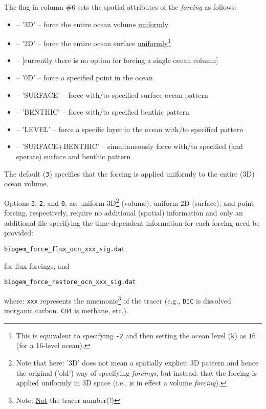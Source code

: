 \noindent The flag in column \#\(6\)  sets the spatial attributes of the \textit{forcing} as follows:
\vspace{1mm}
\begin{itemize}[noitemsep]
\item [3] -- '3D' -- force the entire ocean volume \uline{uniformly}
\item [2] -- '2D' -- force the entire ocean surface \uline{uniformly}\footnote{This is equivalent to specifying \texttt{-2}  and then setting the ocean level (\texttt{k}) as \(16\) (for a 16-level ocean).}
\item [1] -- [currently there is no option for forcing a single ocean column]
\item [0] -- '0D' -- force a specified point in the ocean
\item [-1] -- 'SURFACE' -- force with/to specified surface ocean pattern
\item [-2] -- 'BENTHIC' -- force with/to specified benthic pattern
\item [-3] -- 'LEVEL' -- force a specific layer in the ocean with/to specified pattern
\item [-4] -- 'SURFACE+BENTHIC' -- simultaneously force with/to specified (and sperate) surface and benthic pattern
\end{itemize}
\vspace{1mm}
The default (\texttt{3}) specifies that the forcing is applied uniformly to the entire (3D) ocean volume.

\vspace{1mm}

Options \texttt{3}, \texttt{2}, and \texttt{0}, as: uniform 3D\footnote{Note that here: '3D' does not mean a spatially explicit 3D pattern and hence the original ('old') way of specifying \textit{forcings}, but instead: that the forcing is applied uniformly in 3D space (i.e., is in effect a volume \textit{forcing}).} (volume), uniform 2D (surface), and point forcing, respectively, require no additional (spatial) information and only an additional file specifying the time-dependent information for each forcing need be provided:
\vspace{-1mm}\small\begin{verbatim}
biogem_force_flux_ocn_xxx_sig.dat
\end{verbatim}\normalsize\vspace{-1mm}
for flux forcings, and
\vspace{-1mm}\small\begin{verbatim}
biogem_force_restore_ocn_xxx_sig.dat
\end{verbatim}\normalsize\vspace{-1mm}
where: \texttt{xxx} represents the mnemonic\footnote{Note: \uline{Not} the tracer number(!)} of the tracer (e.g., \texttt{DIC} is dissolved inorganic carbon. \texttt{CH4} is methane, etc.).


